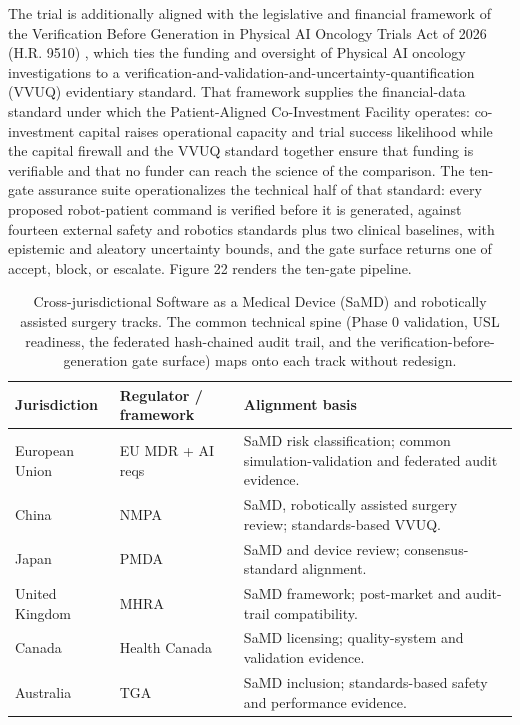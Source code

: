 The trial is additionally aligned with the legislative and financial framework of
the Verification Before Generation in Physical AI Oncology Trials Act of 2026 (H.R.
9510) \cite{kawchak2026hr9510}, which ties the funding and oversight of Physical AI
oncology investigations to a verification-and-validation-and-uncertainty-quantification
(VVUQ) evidentiary standard. That framework supplies the financial-data standard
under which the Patient-Aligned Co-Investment Facility operates: co-investment
capital raises operational capacity and trial success likelihood while the capital
firewall and the VVUQ standard together ensure that funding is verifiable and that
no funder can reach the science of the comparison. The ten-gate assurance suite
operationalizes the technical half of that standard: every proposed robot-patient
command is verified before it is generated, against fourteen external safety and
robotics standards plus two clinical baselines, with epistemic and aleatory
uncertainty bounds, and the gate surface returns one of accept, block, or escalate.
Figure 22 renders the ten-gate pipeline.

\begin{table}[htbp]
\centering
\footnotesize
\caption{Cross-jurisdictional Software as a Medical Device (SaMD) and robotically
assisted surgery tracks. The common technical spine (Phase 0 validation, USL
readiness, the federated hash-chained audit trail, and the
verification-before-generation gate surface) maps onto each track without redesign.}
\label{tab:jurisdictions}
\begin{tabularx}{\textwidth}{L{2.5cm} L{3.2cm} Y}
\toprule
\textbf{Jurisdiction} & \textbf{Regulator / framework} & \textbf{Alignment basis} \\
\midrule
European Union & EU MDR + AI reqs & SaMD risk classification; common simulation-validation and federated audit evidence. \\
China & NMPA & SaMD, robotically assisted surgery review; standards-based VVUQ. \\
Japan & PMDA & SaMD and device review; consensus-standard alignment. \\
United Kingdom & MHRA & SaMD framework; post-market and audit-trail compatibility. \\
Canada & Health Canada & SaMD licensing; quality-system and validation evidence. \\
Australia & TGA & SaMD inclusion; standards-based safety and performance evidence. \\
\bottomrule
\end{tabularx}
\end{table}

